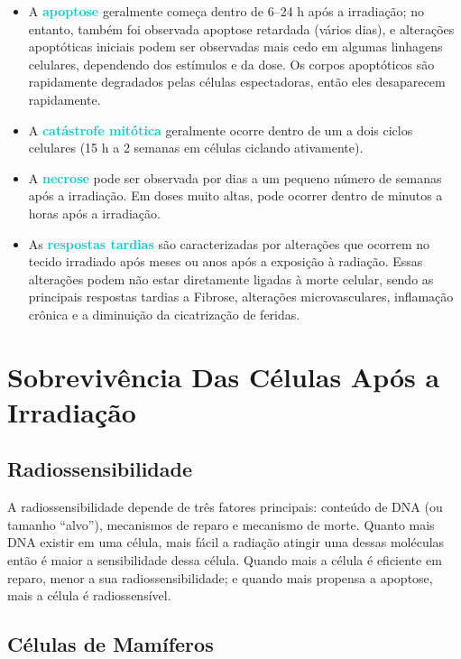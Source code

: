 \documentclass[11pt,a4paper]{article}
\begin{document}
	\begin{itemize}[label=\textcolor{CarnationPink}{$\star$}]
		\item A \textcolor{DarkTurquoise}{\textbf{apoptose}} geralmente começa dentro de 6–24 h após a irradiação; no entanto, também foi observada apoptose retardada (vários dias), e alterações apoptóticas iniciais podem ser observadas mais cedo em algumas linhagens celulares, dependendo dos estímulos e da dose. Os corpos apoptóticos são rapidamente degradados pelas células espectadoras, então eles desaparecem rapidamente.
		\item A \textcolor{DarkTurquoise}{\textbf{catástrofe mitótica}} geralmente ocorre dentro de um a dois ciclos celulares (15 h a 2 semanas em células ciclando ativamente).
		\item A \textcolor{DarkTurquoise}{\textbf{necrose}} pode ser observada por dias a um pequeno número de semanas após a irradiação. Em doses muito altas, pode ocorrer dentro de minutos a horas após a irradiação.
		\item As \textcolor{DarkTurquoise}{\textbf{respostas tardias}} são caracterizadas por alterações que ocorrem no tecido irradiado após meses ou anos após a exposição à radiação. Essas alterações podem não estar diretamente ligadas à morte celular, sendo as principais respostas tardias a Fibrose, alterações microvasculares, inflamação crônica e a diminuição da cicatrização de feridas.
	\end{itemize}


\section{Sobrevivência Das Células Após a Irradiação}

\subsection{Radiossensibilidade}

	A radiossensibilidade depende de três fatores principais: conteúdo de DNA (ou tamanho “alvo”), mecanismos de reparo e mecanismo de morte. Quanto mais DNA existir em uma célula, mais fácil a radiação atingir uma dessas moléculas então é maior a sensibilidade dessa célula. Quando mais a célula é eficiente em reparo, menor a sua radiossensibilidade; e quando mais propensa a apoptose, mais a célula é radiossensível.

\subsection*{Células de Mamíferos}
\end{document}
